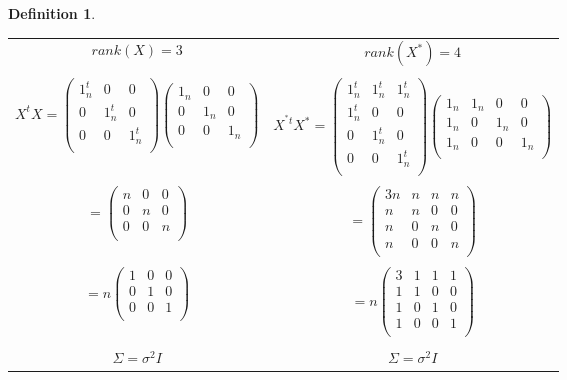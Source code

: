 \documentclass[11pt,a4paper]{article}
\theoremstyle{definition}
\newtheorem{defn}[thm]{Definition}
\begin{document}
\begin{defn}
\begin{enumerate}
\begin{table}[h!]
\centering
\begin{tabular}{c|c}
$rank(X)=3$ & $rank(X^*)=4$\\
&\\
$X^tX =
\begin{pmatrix}
1^t_n & 0 &0\\
0 & 1^t_n & 0\\
0 & 0 & 1^t_n\\
\end{pmatrix}
\begin{pmatrix}
1_n & 0 & 0\\
0 & 1_n & 0\\
0 & 0 & 1_n\\
\end{pmatrix}
$ & $X^{^*t}X^*=
\begin{pmatrix}
1^t_n & 1^t_n & 1^t_n\\
1^t_n & 0 & 0\\
0 & 1^t_n & 0\\
0 & 0 & 1^t_n\\
\end{pmatrix}
\begin{pmatrix}
1_n & 1_n & 0 & 0\\
1_n & 0 & 1_n & 0\\
1_n & 0 & 0 & 1_n\\
\end{pmatrix}
$\\
&\\
$=
\begin{pmatrix}
n & 0 & 0\\
0 & n & 0\\
0 & 0 & n\\
\end{pmatrix}
$ & $=
\begin{pmatrix}
3n & n & n & n\\
n & n & 0 & 0\\
n & 0 & n & 0\\
n & 0 & 0 & n\\
\end{pmatrix}
$\\
&\\
$=n
\begin{pmatrix}
1 & 0 & 0\\
0 & 1 & 0\\
0 & 0 & 1\\
\end{pmatrix}
$ & $=n
\begin{pmatrix}
3 & 1 & 1 & 1\\
1 & 1 & 0 & 0\\
1 & 0 & 1 & 0\\
1 & 0 & 0 & 1\\
\end{pmatrix}
$\\
&\\
$\displaystyle{\Sigma = \sigma^2 I}$ & $\displaystyle{\Sigma=\sigma^2I}$\\
\hline
\end{tabular}
\end{table}





\end{enumerate}
\end{defn}
\end{document}
